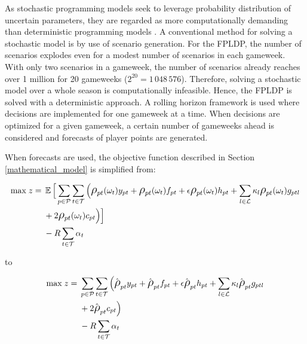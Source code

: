 As stochastic programming models seek to leverage probability distribution of uncertain parameters, they are regarded as more computationally demanding than deterministic programming models \citep{Shapiro}. A conventional method for solving a stochastic model is by use of scenario generation. For the FPLDP, the number of scenarios explodes even for a modest number of scenarios in each gameweek. With only two scenarios in a gameweek, the number of scenarios already reaches over 1 million for 20 gameweeks ($2^{20} = 1\,048\,576$). Therefore, solving a stochastic model over a whole season is computationally infeasible. Hence, the FPLDP is solved with a deterministic approach. A rolling horizon framework is used where decisions are implemented for one gameweek at a time. When decisions are optimized for a given gameweek, a certain number of gameweeks ahead is considered and forecasts of player points are generated.

\newpar


When forecasts are used, the objective function described in Section \ref{mathematical_model} is simplified from: 

\begin{equation*}
\smaller
\begin{aligned}
\text{max} \; z ={} & \EX \Big\lbrack\sum\limits_{p \in \mathcal{P}} \sum\limits_{t \in \mathcal{T}} \Big( \mathlarger{\rho}_{pt}(\omega_{t})y_{pt} + \mathlarger{\rho}_{pt}(\omega_{t})f_{pt} + \epsilon  \mathlarger{\rho}_{pt}(\omega_{t})h_{pt} + \sum_{l \in \mathcal{L}}\kappa_{l} \mathlarger{\rho}_{pt}(\omega_{t})g_{ptl} \\ 
&  + 2 \mathlarger{\rho}_{pt}(\omega_{t})c_{pt} \Big)  \Big\rbrack \\ 
& - R\sum_{t \in \mathcal{T}}\alpha_{t}
\end{aligned}
\end{equation*}

to 

\begin{equation*}
\smaller
\begin{aligned}
\text{max} \; z ={} &  \sum\limits_{p \in \mathcal{P}} \sum\limits_{t \in \mathcal{T}} \Big( \hat{\mathlarger{\rho}}_{pt} y_{pt} + \hat{\mathlarger{\rho}}_{pt} f_{pt} + \epsilon  \hat{\mathlarger{\rho}}_{pt} h_{pt} + \sum_{l \in \mathcal{L}}\kappa_{l} \hat{\mathlarger{\rho}}_{pt} g_{ptl} \\ 
& + 2 \hat{\mathlarger{\rho}}_{pt} c_{pt} \Big)  \\ 
& - R\sum_{t \in \mathcal{T}}\alpha_{t}
\end{aligned}
\end{equation*}


